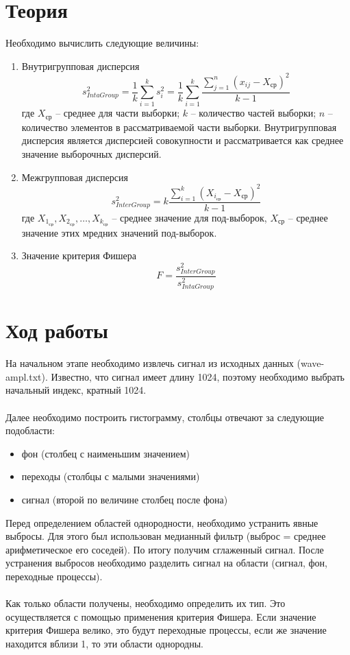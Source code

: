 \documentclass{article}
\begin{document}
\section{Теория}
\noindent Необходимо вычислить следующие величины:
\begin{enumerate}
    \item Внутригрупповая дисперсия 
    \begin{equation}
        s_{IntaGroup}^{2} = \frac{1}{k} \sum_{i=1}^{k} s_i^{2} = \frac{1}{k} \sum_{i=1}^{k} \frac{\sum_{j=1}^{n} (x_{ij}-X_{ср})^{2}}{k-1}
    \end{equation}
где $X_{ср}$ -- среднее для части выборки; $k$ -- количество частей выборки; $n$ -- количество элементов в рассматриваемой части выборки. Внутригрупповая дисперсия является дисперсией совокупности и рассматривается как среднее значение выборочных дисперсий.
\item Межгрупповая дисперсия
\begin{equation}
        s_{InterGroup}^{2}  = k \frac{\sum_{i=1}^{k} (X_{i_{ср}}-X_{ср})^{2}}{k-1}
    \end{equation}
где $X_{1_{ср}}, X_{2_{ср}}, \dots, X_{k_{ср}}$ -- среднее значение для под-выборок, $X_{ср}$ -- среднее значение этих мредних значений под-выборок.
\item Значение критерия Фишера
\begin{equation}
    F=\frac{s_{InterGroup}^{2}}{s_{IntaGroup}^{2}}
\end{equation}
\end{enumerate}

\section{Ход работы}
\noindent На начальном этапе необходимо извлечь сигнал из исходных данных
(wave-ampl.txt). Известно, что сигнал имеет длину 1024, поэтому необходимо
выбрать начальный индекс, кратный 1024.\\\\
\noindent Далее необходимо построить гистограмму, столбцы отвечают за
следующие подобласти:
\begin{itemize}
    \item фон (столбец с наименьшим значением)
    \item переходы (столбцы с малыми значениями)
    \item сигнал (второй по величине столбец после фона)
\end{itemize}
\noindent Перед определением областей однородности, необходимо устранить
явные выбросы. Для этого был использован медианный фильтр (выброс =
среднее арифметическое его соседей). По итогу получим сглаженный сигнал.
После устранения выбросов необходимо разделить сигнал на области
(сигнал, фон, переходные процессы). \\\\
\noindent Как только области получены, необходимо определить их тип. Это
осуществляется с помощью применения критерия Фишера. Если значение
критерия Фишера велико, это будут переходные процессы, если же значение
находится вблизи 1, то эти области однородны.
\end{document}
